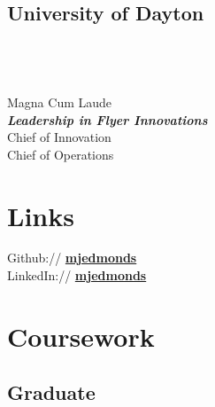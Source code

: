 \documentclass[letterpaper]{deedy-resume} %
\begin{document}
\begin{minipage}[t]{0.27\textwidth}
\subsection{University of Dayton}
 \\
 \\
\\
Magna Cum Laude\\
{\footnotesize \textit{\textbf{Leadership in Flyer Innovations}}} \\
Chief of Innovation\\
Chief of Operations\\


\sectionspace %






\section{Links} 

Github:// \href{https://github.com/mjedmonds}{\bf mjedmonds} \\
LinkedIn:// \href{https://www.linkedin.com/in/mjedmonds}{\bf mjedmonds} \\

\sectionspace %


\section{Coursework}

\subsection{Graduate}


\end{minipage}
\end{document}
